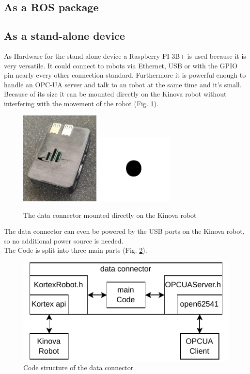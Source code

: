 \documentclass[conference]{IEEEtran}
\begin{document}
\subsection{As a ROS package}
\subsection{As a stand-alone device}
As Hardware for the stand-alone device a Raspberry PI 3B+ is used because it is very versatile. It could connect to robots via Ethernet, USB or with the GPIO pin nearly every other connection standard.
Furthermore it is powerful enough to handle an OPC-UA server and talk to an robot at the same time and it's small.
Because of its size it can be mounted directly on the Kinova robot without interfering with the movement of the robot (Fig. \ref{fig:dataConectorPic}).
\begin{figure}[htbp]
    \centerline{\includegraphics[width=4cm]{Pictures/PiGehaeuseVorne.jpeg}\includegraphics[width=4cm]{Pictures/fig1.png}}
    \caption{The data connector mounted directly on the Kinova robot}
    \label{fig:dataConectorPic}
\end{figure}
The data connector can even be powered by the USB ports on the Kinova robot, so no additional power source is needed.\\
The Code is split into three main parts (Fig. \ref{fig:dataConectorStructure}).
\begin{figure}[htbp]
    \centerline{\includegraphics{Pictures/dataConectorStructure.pdf}}
    \caption{Code structure of the data connector}
    \label{fig:dataConectorStructure}
\end{figure}
\end{document}

